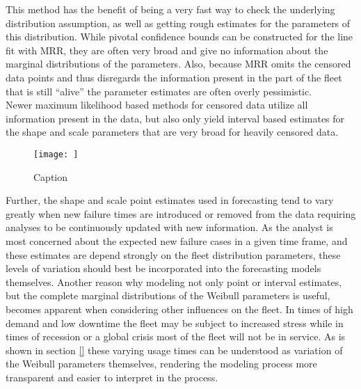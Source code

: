 This method has the benefit of being a very fast way to check the underlying distribution assumption, as well as getting rough estimates for the parameters of this distribution. While pivotal confidence bounds can be constructed for the line fit with MRR, they are often very broad and give no information about the marginal distributions of the parameters. Also, because MRR omits the censored data points and thus disregards the information present in the part of the fleet that is still ``alive'' the parameter estimates are often overly pessimistic. \\
Newer maximum likelihood based methods for censored data utilize all information present in the data, but also only yield interval based estimates for the shape and scale parameters that are very broad for heavily censored data. 
\begin{figure}
    \centering
    \texttt{[image: ]}
    \caption{Caption}
    \label{fig:mleintervalls}
\end{figure}
Further, the shape and scale point estimates used in forecasting tend to vary greatly when new failure times are introduced or removed from the data requiring analyses to be continuously updated with new information. As the analyst is most concerned about the expected new failure cases in a given time frame, and these estimates are depend strongly on the fleet distribution parameters, these levels of variation should best be incorporated into the forecasting models themselves. Another reason why modeling not only point or interval estimates, but the complete marginal distributions of the Weibull parameters is useful, becomes apparent when considering other influences on the fleet. In times of high demand and low downtime the fleet may be subject to increased stress while in times of recession or a global crisis most of the fleet will not be in service. As is shown in section \ref{} these varying usage times can be understood as variation of the Weibull parameters themselves, rendering the modeling process more transparent and easier to interpret in the process. 
